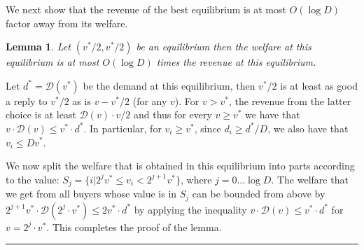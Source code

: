 \documentclass[11pt,a4paper]{article}
\newcommand{\qed}{\rule{1.5mm}{2mm}\vspace{0.1in}}
\newenvironment{proof}{\par\noindent{\bf Proof:}}{\qed}
\newcommand{\D}{\mathcal{D}}
\newcommand{\ignore}[1]{}
\newtheorem{lemma}[theorem]{Lemma}
\begin{document}
\ignore{	
We first show that the revenue of the best equilibrium is at most  $\sqrt{D}$ factor away from the monopolist revenue.
\begin{lemma}
	The best equilibrium has revenue of at least $1/\sqrt{D}$ fraction
	of the monopolist revenue.
\end{lemma}
\begin{proof}
	Let us consider the symmetrized best-reply dynamics starting from
	an equal split of the minimal monopoly price $p_0$.
	This gives	us a sequence $p_0 < p_1 < \cdots < p_t$ of total prices, where
	at each stage $p_{i+1}-p_i/2$ is a best response to $p_i/2$, and
	$(p_t/2,p_t/2)$ is the best equilibrium.  Denote the
	demand at combined price $p_i$ by $d_i = \D(p_i)$, and the
	revenue by $r_i = d_i \cdot p_i$.
	
	We can now apply the previous lemma to each stage and get
	$(r_{i+1}/r_i)^2 \ge d_{i+1}/d_i$, and putting all these inequalities
	together get $(r_t/r_0)^2 \ge d_t/d_0$, or $r_t \ge r_0 \sqrt{d_t/d_0}$.  The theorem follows since
	$d_t/d_0 \ge 1/D$, $r_t$ is the revenue in the best equilibrium and $r_0$ is the monopolist revenue.
\end{proof}
} %

We next show that the revenue of the best equilibrium is at most  $O(\log D)$ factor away from its welfare.
\begin{lemma} \label{revwel}
	Let $(v^*/2,v^*/2)$ be an equilibrium then the welfare at this equilibrium is at most $O(\log D)$ times the
	revenue at this equilibrium.
\end{lemma}
\begin{proof}
	Let $d^*=\D(v^*)$ be the demand at this equilibrium, then
	$v^*/2$ is at least as good a reply to $v^*/2$ as is $v-v^*/2$ (for any $v$).  For $v > v^*$, the revenue
	from the latter choice is at least $\D(v) \cdot v/2$ and thus for every $v \ge v^*$ we have that
	$v \cdot \D(v) \le v^* \cdot d^*$.
	In particular, for $v_i \ge v^*$, since $d_i \ge d^* / D$, we also have that $v_i \le D v^*$.
	
	We now split the welfare that is obtained in this equilibrium
	into parts according to the value: $S_j = \{ i | 2^j v^* \le v_i < 2^{j+1} v^* \}$,
	where $j = 0 ... \log D$.  The welfare that we get from all buyers whose value is in $S_j$
	can be bounded from above by $2^{j+1} v^* \cdot \D(2^j \cdot v^*) \le 2 v^* \cdot d^*$
	by applying the inequality $v \cdot \D(v) \le v^* \cdot d^*$ for $v=2^j \cdot v^*$.
	This completes the proof of the lemma.
\end{proof}
\end{document}
